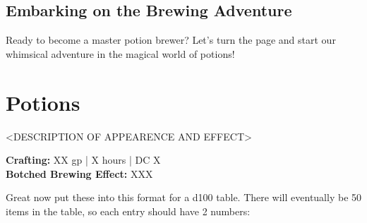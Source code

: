 \documentclass[letterpaper,twocolumn,openany,nodeprecatedcode]{dndbook}
\begin{document}
\section{Embarking on the Brewing Adventure}
    Ready to become a master potion brewer? Let's turn the page and start our whimsical adventure in the magical world of potions!





\chapter{Potions}

<DESCRIPTION OF APPEARENCE AND EFFECT>

\textbf{Crafting:} XX gp | X hours | DC X \\
\textbf{Botched Brewing Effect:} XXX



Great now put these into this format for a d100 table. There will eventually be 50 items in the table, so each entry should have 2 numbers:
\end{document}
